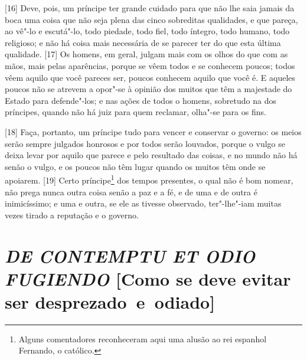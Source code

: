 {[}16{]} Deve, pois, um príncipe ter grande cuidado para que não lhe
saia jamais da boca uma coisa que não seja plena das cinco sobreditas
qualidades, e que pareça, ao vê"-lo e escutá"-lo, todo piedade, todo
fiel, todo íntegro, todo humano, todo religioso; e não há coisa mais
necessária de se parecer ter do que esta última qualidade. {[}17{]} Os
homens, em geral, julgam mais com os olhos do que com as mãos, mais
pelas aparências, porque se vêem todos e se conhecem poucos; todos vêem
aquilo que você pareces ser, poucos conhecem aquilo que você é. E
aqueles poucos não se atrevem a opor"-se à opinião dos muitos que têm a
majestade do Estado para defende"-los; e nas ações de todos o homens,
sobretudo na dos príncipes, quando não há juiz para quem reclamar,
olha"-se para os fins.

{[}18{]} Faça, portanto, um príncipe tudo para vencer e conservar o
governo: os meios serão sempre julgados honrosos e por todos serão
louvados, porque o vulgo se deixa levar por aquilo que parece e pelo
resultado das coisas, e no mundo não há senão o vulgo, e os poucos não
têm lugar quando os muitos têm onde se apoiarem. {[}19{]} Certo
príncipe\footnote{Alguns comentadores reconheceram aqui uma alusão ao
  rei espanhol Fernando, o católico.} dos tempos presentes, o qual não é
bom nomear, não prega nunca outra coisa senão a paz e a fé, e de uma e
de outra é inimicíssimo; e uma e outra, se ele as tivesse observado,
ter"-lhe"-iam muitas vezes tirado a reputação e o governo.

\quebra\section{\emph{DE CONTEMPTU ET ODIO FUGIENDO}\break
{[}Como se deve evitar ser desprezado~e~odiado{]}}

